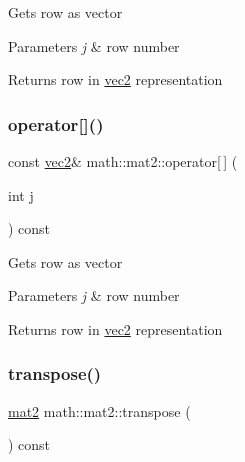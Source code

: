 Gets row as vector 
\begin{DoxyParams}{Parameters}
{\em j} & row number \\
\hline
\end{DoxyParams}
\begin{DoxyReturn}{Returns}
row in \hyperlink{structmath_1_1vec2}{vec2} representation 
\end{DoxyReturn}
\mbox{\label{structmath_1_1mat2_ac3a7c6540e29afae00ed93c5c103d3a4}} 
\subsubsection{\texorpdfstring{operator[]()}{operator[]()}\hspace{0.1cm}{\footnotesize\ttfamily [2/2]}}
{\footnotesize\ttfamily const \hyperlink{structmath_1_1vec2}{vec2}\& math\+::mat2\+::operator\mbox{[}$\,$\mbox{]} (\begin{DoxyParamCaption}\item[{int}]{j }\end{DoxyParamCaption}) const\hspace{0.3cm}{\ttfamily [inline]}}

Gets row as vector 
\begin{DoxyParams}{Parameters}
{\em j} & row number \\
\hline
\end{DoxyParams}
\begin{DoxyReturn}{Returns}
row in \hyperlink{structmath_1_1vec2}{vec2} representation 
\end{DoxyReturn}
\mbox{\label{structmath_1_1mat2_ad005191511a9be3a91dca76960607394}} 
\subsubsection{\texorpdfstring{transpose()}{transpose()}}
{\footnotesize\ttfamily \hyperlink{structmath_1_1mat2}{mat2} math\+::mat2\+::transpose (\begin{DoxyParamCaption}{ }\end{DoxyParamCaption}) const\hspace{0.3cm}{\ttfamily [inline]}}

